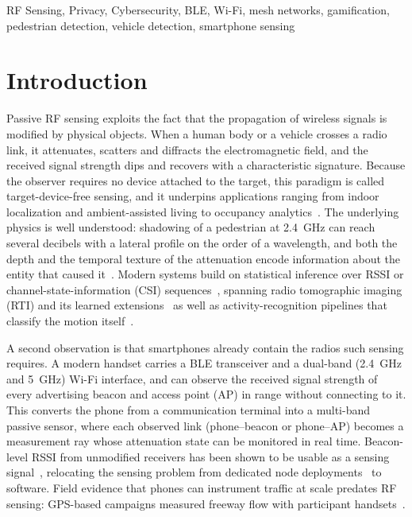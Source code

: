 \documentclass[conference,10pt]{IEEEtran}
\begin{document}
\begin{IEEEkeywords}
RF Sensing, Privacy, Cybersecurity, BLE, Wi-Fi, mesh networks, gamification,
pedestrian detection, vehicle detection, smartphone sensing
\end{IEEEkeywords}

\section{Introduction}
Passive RF sensing exploits the fact that the propagation of wireless signals
is modified by physical objects. When a human body or a vehicle crosses a
radio link, it attenuates, scatters and diffracts the electromagnetic field,
and the received signal strength dips and recovers with a characteristic
signature. Because the observer requires no device attached to the target,
this paradigm is called target-device-free sensing, and it underpins
applications ranging from indoor localization and ambient-assisted living to
occupancy analytics~\cite{wilson2010}. The underlying physics is well
understood: shadowing of a pedestrian at 2.4~GHz can reach several decibels
with a lateral profile on the order of a wavelength, and both the depth and
the temporal texture of the attenuation encode information about the entity
that caused it~\cite{januszkiewicz2018,patwari2010proc}. Modern systems build on statistical
inference over RSSI or channel-state-information (CSI)
sequences~\cite{ma2019wifi}, spanning radio tomographic imaging (RTI) and its
learned extensions~\cite{alippi2016,li2024,wu2024} as well as
activity-recognition pipelines that classify the motion
itself~\cite{wang2015har,wong2024,sanchez2020}.

A second observation is that smartphones already contain the radios such
sensing requires. A modern handset carries a BLE transceiver and a dual-band
(2.4~GHz and 5~GHz) Wi-Fi interface, and can observe the received signal
strength of every advertising beacon and access point (AP) in range without
connecting to it. This converts the phone from a communication terminal into
a multi-band passive sensor, where each observed link (phone--beacon or
phone--AP) becomes a measurement ray whose attenuation state can be monitored
in real time. Beacon-level RSSI from unmodified receivers has been shown to
be usable as a sensing
signal~\cite{ramirez2021,milano2024,bai2020}, relocating the sensing problem
from dedicated node deployments~\cite{wilson2010,alippi2016} to software. Field evidence that phones can instrument traffic at scale predates RF sensing: GPS-based campaigns measured freeway flow with participant handsets~\cite{herrera2010}.
\end{document}
